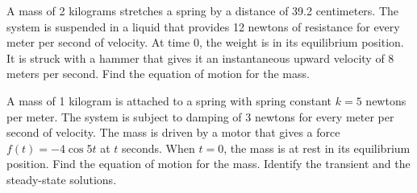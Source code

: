 \documentclass[12pt]{exam}
\begin{document}
\begin{questions}

\question
A mass of 2 kilograms stretches a spring by a distance of 39.2 centimeters.  The system is suspended in a liquid that provides 12 newtons of resistance for every meter per second of velocity.  At time 0, the weight is in its equilibrium position.  It is struck with a hammer that gives it an instantaneous upward velocity of 8 meters per second.  Find the equation of motion for the mass.

\question
A mass of 1 kilogram is attached to a spring with spring constant $k = 5$ newtons per meter.  The system is subject to damping of 3 newtons for every meter per second of velocity.  The mass is driven by a motor that gives a force $f(t) = -4 \cos 5t$ at $t$ seconds.  When $t = 0$, the mass is at rest in its equilibrium position.  Find the equation of motion for the mass.  Identify the transient and the steady-state solutions.

\end{questions}
\end{document}
